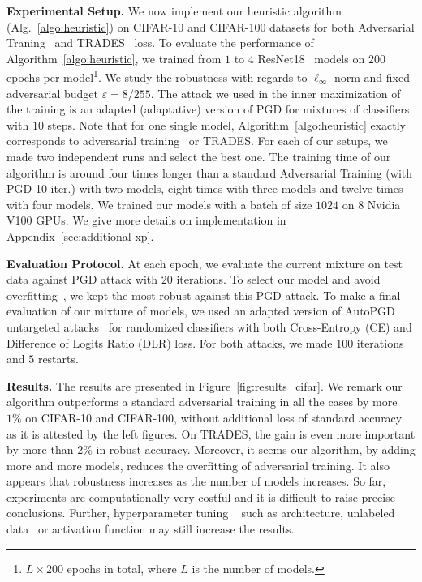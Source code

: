 
\textbf{Experimental Setup.} We now implement our heuristic algorithm (Alg.~\ref{algo:heuristic}) on CIFAR-10 and CIFAR-100 datasets for both Adversarial Traning~\citep{madry2017towards} and TRADES~\citep{zhang2019theoretically} loss. To evaluate the performance of Algorithm~\ref{algo:heuristic}, we trained from $1$ to $4$ ResNet18~\citep{He_2016_CVPR} models on $200$ epochs per model\footnote{$L\times200$ epochs in total, where $L$ is the number of models.}. We study the robustness with regards to $\ell_\infty$ norm and fixed adversarial budget $\varepsilon=8/255$. The attack we used in the inner maximization of the training is an adapted (adaptative) version of PGD for mixtures of classifiers with $10$ steps. Note that for one single model, Algorithm~\ref{algo:heuristic} exactly corresponds to adversarial training~\citep{madry2017towards} or TRADES. For each of our setups, we made two independent runs and select the  best one. The training time of our algorithm is around four times longer than a standard Adversarial Training (with PGD 10 iter.) with two models, eight times with three models and twelve times with four models. We trained our models with a batch of size  $1024$ on $8$ Nvidia V100 GPUs. We give more details on implementation in Appendix~\ref{sec:additional-xp}. 

\textbf{Evaluation Protocol.} At each epoch, we evaluate the current mixture on test data against PGD attack  with $20$ iterations. To select our model and avoid overfitting~\citep{rice2020overfitting}, we kept the most robust against this PGD attack.
To make a final evaluation of our mixture of models, we used an adapted version of $\textrm{AutoPGD}$ untargeted attacks~\citep{croce2020reliable} for randomized classifiers with both Cross-Entropy (CE) and Difference of Logits Ratio (DLR) loss. For both attacks, we made $100$ iterations and $5$ restarts.

\textbf{Results.} The results are presented in Figure~\ref{fig:results_cifar}. We remark our algorithm outperforms a standard adversarial training in all the cases by more $1\%$ on CIFAR-10 and CIFAR-100, without additional loss of standard accuracy as it is attested by the left figures. On TRADES, the gain is even more important by more than $2\%$ in robust accuracy. Moreover, it seems our algorithm, by adding more and more models, reduces the overfitting of adversarial training. It also appears that robustness increases as the number of models increases. So far, experiments are computationally very costful and it is difficult to raise precise conclusions. Further, hyperparameter tuning ~\citep{gowal2020uncovering} such as architecture, unlabeled data~\citep{carmon2019unlabeled} or activation function may still increase the results.





